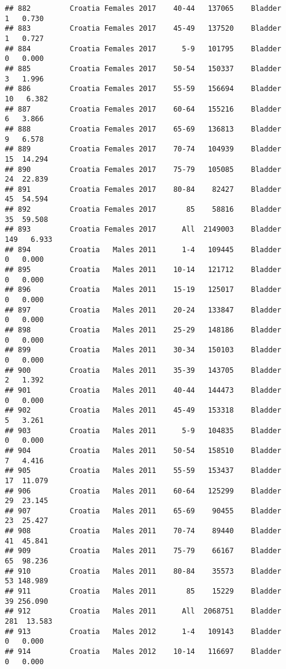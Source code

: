\documentclass[
]{article}
\begin{document}
\begin{verbatim}
## 882         Croatia Females 2017    40-44   137065    Bladder      1   0.730
## 883         Croatia Females 2017    45-49   137520    Bladder      1   0.727
## 884         Croatia Females 2017      5-9   101795    Bladder      0   0.000
## 885         Croatia Females 2017    50-54   150337    Bladder      3   1.996
## 886         Croatia Females 2017    55-59   156694    Bladder     10   6.382
## 887         Croatia Females 2017    60-64   155216    Bladder      6   3.866
## 888         Croatia Females 2017    65-69   136813    Bladder      9   6.578
## 889         Croatia Females 2017    70-74   104939    Bladder     15  14.294
## 890         Croatia Females 2017    75-79   105085    Bladder     24  22.839
## 891         Croatia Females 2017    80-84    82427    Bladder     45  54.594
## 892         Croatia Females 2017       85    58816    Bladder     35  59.508
## 893         Croatia Females 2017      All  2149003    Bladder    149   6.933
## 894         Croatia   Males 2011      1-4   109445    Bladder      0   0.000
## 895         Croatia   Males 2011    10-14   121712    Bladder      0   0.000
## 896         Croatia   Males 2011    15-19   125017    Bladder      0   0.000
## 897         Croatia   Males 2011    20-24   133847    Bladder      0   0.000
## 898         Croatia   Males 2011    25-29   148186    Bladder      0   0.000
## 899         Croatia   Males 2011    30-34   150103    Bladder      0   0.000
## 900         Croatia   Males 2011    35-39   143705    Bladder      2   1.392
## 901         Croatia   Males 2011    40-44   144473    Bladder      0   0.000
## 902         Croatia   Males 2011    45-49   153318    Bladder      5   3.261
## 903         Croatia   Males 2011      5-9   104835    Bladder      0   0.000
## 904         Croatia   Males 2011    50-54   158510    Bladder      7   4.416
## 905         Croatia   Males 2011    55-59   153437    Bladder     17  11.079
## 906         Croatia   Males 2011    60-64   125299    Bladder     29  23.145
## 907         Croatia   Males 2011    65-69    90455    Bladder     23  25.427
## 908         Croatia   Males 2011    70-74    89440    Bladder     41  45.841
## 909         Croatia   Males 2011    75-79    66167    Bladder     65  98.236
## 910         Croatia   Males 2011    80-84    35573    Bladder     53 148.989
## 911         Croatia   Males 2011       85    15229    Bladder     39 256.090
## 912         Croatia   Males 2011      All  2068751    Bladder    281  13.583
## 913         Croatia   Males 2012      1-4   109143    Bladder      0   0.000
## 914         Croatia   Males 2012    10-14   116697    Bladder      0   0.000

\end{verbatim}
\end{document}
